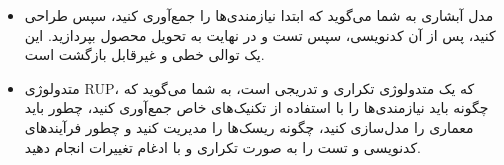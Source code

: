 \begin{itemize}
	\item مدل آبشاری به شما می‌گوید که ابتدا نیازمندی‌ها را جمع‌آوری کنید، سپس طراحی کنید، پس از آن کدنویسی، سپس تست و در نهایت به تحویل محصول بپردازید. این یک توالی خطی و غیرقابل بازگشت است.
	\item متدولوژی RUP، که یک متدولوژی تکراری و تدریجی است، به شما می‌گوید که چگونه باید نیازمندی‌ها را با استفاده از تکنیک‌های خاص جمع‌آوری کنید، چطور باید معماری را مدل‌سازی کنید، چگونه ریسک‌ها را مدیریت کنید و چطور فرآیندهای کدنویسی و تست را به صورت تکراری و با ادغام تغییرات انجام دهید.
\end{itemize}